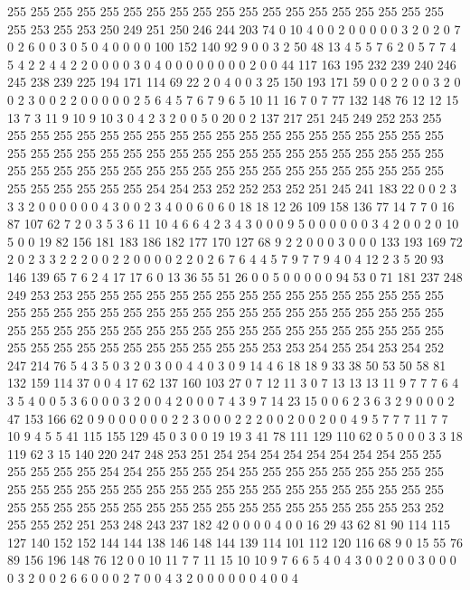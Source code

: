 255 255 255 255 255 255 255 255 255 255 255 255 255 255 255 255 255 255 255 255
253 255 253 250 249 251 250 246 244 203 74 0 10 4 0 0 2 0 0 0
0 0 3 2 0 2 0 7 0 2 6 0 0 3 0 5 0 4 0 0
0 0 100 152 140 92 9 0 0 3 2 50 48 13 4 5 5 7 6 2
0 5 7 7 4 5 4 2 2 4 4 2 2 0 0 0 0 3 0 4
0 0 0 0 0 0 0 0 2 0 0 44 117 163 195 232 239 240 246 245
238 239 225 194 171 114 69 22 2 0 4 0 0 3 25 150 193 171 59 0
0 2 2 0 0 3 2 0 0 2 3 0 0 2 2 0 0 0 0 0
2 5 6 4 5 7 6 7 9 6 5 10 11 16 7 0 7 77 132 148
76 12 12 15 13 7 3 11 9 10 9 10 3 0 4 2 3 2 0 0
5 0 20 0 2 137 217 251 245 249 252 253 255 255 255 255 255 255 255 255
255 255 255 255 255 255 255 255 255 255 255 255 255 255 255 255 255 255 255 255
255 255 255 255 255 255 255 255 255 255 255 255 255 255 255 255 255 255 255 255
255 255 255 255 255 255 255 255 255 255 255 255 255 255 255 255 254 254 253 252
252 253 252 251 245 241 183 22 0 0 2 3 3 3 2 0 0 0 0 0
0 4 3 0 0 2 3 4 0 0 6 0 6 0 18 18 12 26 109 158
136 77 14 7 7 0 16 87 107 62 7 2 0 3 5 3 6 11 10 4
6 6 4 2 3 4 3 0 0 0 9 5 0 0 0 0 0 0 3 4
2 0 0 2 0 10 5 0 0 19 82 156 181 183 186 182 177 170 127 68
9 2 2 0 0 0 3 0 0 0 133 193 169 72 2 0 2 3 3 2
2 2 0 0 2 2 0 0 0 0 2 2 0 2 6 7 6 4 4 5
7 9 7 7 9 4 0 4 12 2 3 5 20 93 146 139 65 7 6 2
4 17 17 6 0 13 36 55 51 26 0 0 5 0 0 0 0 0 94 53
0 71 181 237 248 249 253 253 255 255 255 255 255 255 255 255 255 255 255 255
255 255 255 255 255 255 255 255 255 255 255 255 255 255 255 255 255 255 255 255
255 255 255 255 255 255 255 255 255 255 255 255 255 255 255 255 255 255 255 255
255 255 255 255 255 255 255 255 255 255 255 255 255 253 253 254 255 254 253 254
252 247 214 76 5 4 3 5 0 3 2 0 3 0 0 4 4 0 3 0
9 14 4 6 18 18 9 33 38 50 53 50 58 81 132 159 114 37 0 0
4 17 62 137 160 103 27 0 7 12 11 3 0 7 13 13 13 11 9 7
7 7 6 4 3 5 4 0 0 5 3 6 0 0 0 3 2 0 0 4
2 0 0 0 7 4 3 9 7 14 23 15 0 0 6 2 3 6 3 2
9 0 0 0 2 47 153 166 62 0 9 0 0 0 0 0 0 2 2 3
0 0 0 2 2 2 0 0 2 0 0 2 0 0 4 9 5 7 7 7
11 7 7 10 9 4 5 5 41 115 155 129 45 0 3 0 0 19 19 3
41 78 111 129 110 62 0 5 0 0 0 3 3 18 119 62 3 15 140 220
247 248 253 251 254 254 254 254 254 254 254 254 255 255 255 255 255 255 254 254
255 255 255 254 255 255 255 255 255 255 255 255 255 255 255 255 255 255 255 255
255 255 255 255 255 255 255 255 255 255 255 255 255 255 255 255 255 255 255 255
255 255 255 255 255 255 255 255 255 253 252 255 255 252 251 253 248 243 237 182
42 0 0 0 0 4 0 0 16 29 43 62 81 90 114 115 127 140 152 152
144 144 138 146 148 144 139 114 101 112 120 116 68 9 0 15 55 76 89 156
196 148 76 12 0 0 10 11 7 7 11 15 10 10 9 7 6 6 5 4
0 4 3 0 0 2 0 0 3 0 0 0 0 3 2 0 0 2 6 6
0 0 0 2 7 0 0 4 3 2 0 0 0 0 0 0 4 0 0 4

